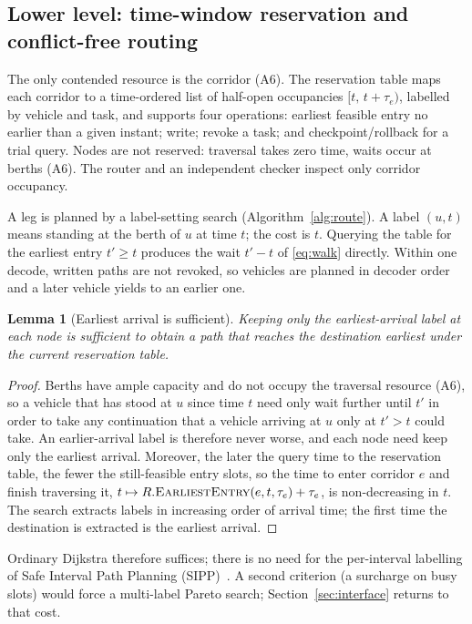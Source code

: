 \documentclass[manuscript,screen,review]{acmart}
\newtheorem{lem}{Lemma}
\begin{document}
\subsection{Lower level: time-window reservation and conflict-free routing}
\label{sec:router}

The only contended resource is the corridor (A6).
The reservation table maps each corridor to a time-ordered list of half-open occupancies $[t,\,t+\tau_e)$, labelled by vehicle and task, and supports four operations: earliest feasible entry no earlier than a given instant; write; revoke a task; and checkpoint/rollback for a trial query.
Nodes are not reserved: traversal takes zero time, waits occur at berths (A6).
The router and an independent checker inspect only corridor occupancy.

A leg is planned by a label-setting search (Algorithm~\ref{alg:route}).
A label $(u,t)$ means standing at the berth of $u$ at time $t$; the cost is $t$.
Querying the table for the earliest entry $t'\ge t$ produces the wait $t'-t$ of \eqref{eq:walk} directly.
Within one decode, written paths are not revoked, so vehicles are planned in decoder order and a later vehicle yields to an earlier one.

\begin{lem}[Earliest arrival is sufficient]
\label{lem:label}
Keeping only the earliest-arrival label at each node is sufficient to obtain a path that reaches the destination earliest under the current reservation table.
\end{lem}

\begin{proof}
  Berths have ample capacity and do not occupy the traversal resource (A6), so a vehicle that has stood at $u$ since time $t$ need only wait further until $t'$
  in order to take any continuation that a vehicle arriving at $u$ only at $t'>t$ could take.
  An earlier-arrival label is therefore never worse, and each node need keep only the earliest arrival.
  Moreover, the later the query time to the reservation table, the fewer the still-feasible entry slots,
  so the time to enter corridor $e$ and finish traversing it,
  $t\mapsto R.\textsc{EarliestEntry}(e,t,\tau_e)+\tau_e$,
  is non-decreasing in $t$.
  The search extracts labels in increasing order of arrival time; the first time the destination is extracted is the earliest arrival.
\end{proof}

Ordinary Dijkstra therefore suffices; there is no need for the per-interval labelling of Safe Interval Path Planning (SIPP)~\cite{kasaura2022sipp}.
A second criterion (a surcharge on busy slots) would force a multi-label Pareto search; Section~\ref{sec:interface} returns to that cost.
\end{document}
